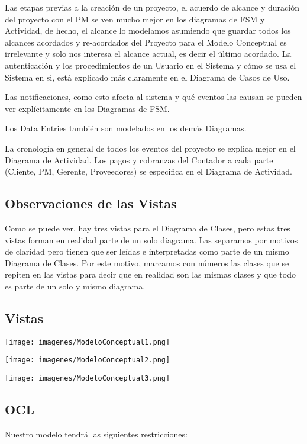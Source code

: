 Las etapas previas a la creación de un proyecto, el acuerdo de alcance y duración del proyecto con el PM se ven mucho mejor en los diagramas de FSM y Actividad, de hecho, el alcance lo modelamos asumiendo que guardar todos los alcances acordados y re-acordados del Proyecto para el Modelo Conceptual es irrelevante y solo nos interesa el alcance actual, es decir el último acordado.
La autenticación y los procedimientos de un Usuario en el Sistema y cómo se usa el Sistema en si, está explicado más claramente en el Diagrama de Casos de Uso.

Las notificaciones, como esto afecta al sistema y qué eventos las causan se pueden ver explícitamente en los Diagramas de FSM. 

Los Data Entries también son modelados en los demás Diagramas. 

La cronología en general de todos los eventos del proyecto se explica mejor en el Diagrama de Actividad.
Los pagos y cobranzas del Contador a cada parte (Cliente, PM, Gerente, Proveedores) se especifica en el Diagrama de Actividad.

\subsection{Observaciones de las Vistas}
Como se puede ver, hay tres vistas para el Diagrama de Clases, pero estas tres vistas forman en realidad parte de un solo diagrama. Las separamos por motivos de claridad pero tienen que ser leídas e interpretadas como parte de un mismo Diagrama de Clases. Por este motivo, marcamos con números las clases que se repiten en las vistas para decir que en realidad son las mismas clases y que todo es parte de un solo y mismo diagrama.

\newpage
\subsection{Vistas}
\begin{center}
\texttt{[image: imagenes/ModeloConceptual1.png]}
\end{center}
\newpage
\begin{center}
\texttt{[image: imagenes/ModeloConceptual2.png]}
\end{center}
\newpage
\begin{center}
\texttt{[image: imagenes/ModeloConceptual3.png]}
\end{center}

\newpage
\subsection{OCL}
Nuestro modelo tendrá las siguientes restricciones: